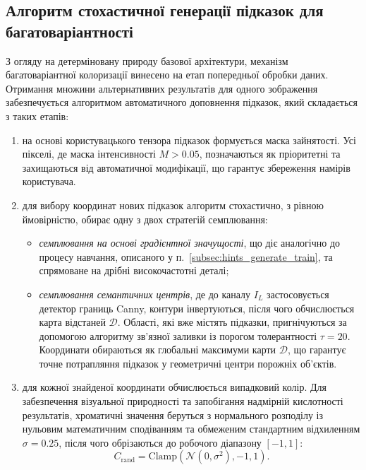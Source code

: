         \subsection{Алгоритм стохастичної генерації підказок для багатоваріантності}
            З огляду на детерміновану природу базової архітектури, механізм багатоваріантної колоризації винесено на етап попередньої обробки даних.
            Отримання множини альтернативних результатів для одного зображення забезпечується алгоритмом автоматичного доповнення підказок,
            який складається з таких етапів:
            \begin{enumerate}
                \item на основі користувацького тензора підказок формується маска зайнятості.
                    Усі пікселі, де маска інтенсивності $M > 0.05$, позначаються як пріоритетні та захищаються від автоматичної модифікації, що гарантує збереження намірів користувача.
                
                \item для вибору координат нових підказок алгоритм стохастично, з рівною ймовірністю, обирає одну з двох стратегій семплювання:
                    \begin{itemize}[label=$\bullet$]
                        \item \textit{семплювання на основі градієнтної значущості}, що діє аналогічно до процесу навчання, описаного у п.~\ref{subsec:hints_generate_train}, та спрямоване на дрібні високочастотні деталі;
                        \item \textit{семплювання семантичних центрів}, де до каналу $I_L$ застосовується детектор границь Canny, контури інвертуються, після чого обчислюється карта відстаней $\mathcal{D}$.
                            Області, які вже містять підказки, пригнічуються за допомогою алгоритму зв'язної заливки із порогом толерантності $\tau=20$.
                            Координати обираються як глобальні максимуми карти $\mathcal{D}$, що гарантує точне потрапляння підказок у геометричні центри порожніх об'єктів.
                    \end{itemize}
                
                \item для кожної знайденої координати обчислюється випадковий колір.
                    Для забезпечення візуальної природності та запобігання надмірній кислотності результатів,
                    хроматичні значення беруться з нормального розподілу із нульовим математичним сподіванням
                    та обмеженим стандартним відхиленням $\sigma = 0.25$,
                    після чого обрізаються до робочого діапазону $[-1, 1]$:
                    \begin{equation*}
                        C_{\mathrm{rand}} = \mathrm{Clamp}(\mathcal{N}(0, \sigma^2), -1, 1).
                    \end{equation*}
                

\end{enumerate}
